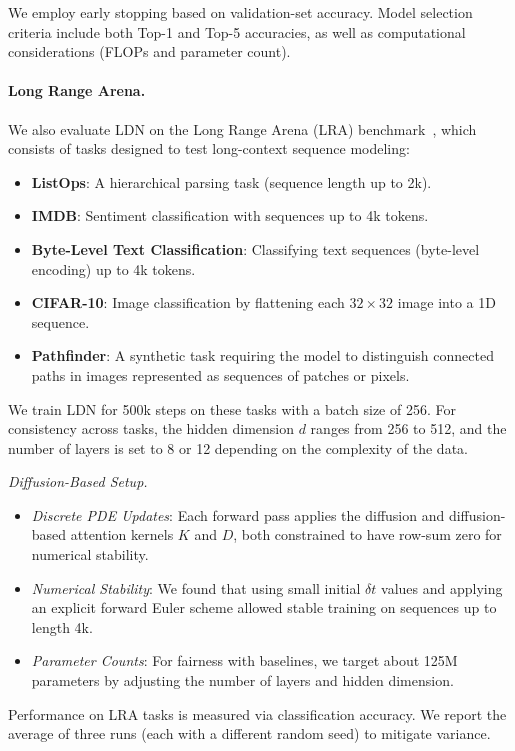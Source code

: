 We employ early stopping based on validation-set accuracy. Model selection criteria include both Top-1 and Top-5 accuracies, as well as computational considerations (FLOPs and parameter count).

\paragraph{Long Range Arena.}
We also evaluate LDN on the Long Range Arena (LRA) benchmark~\cite{tay2021long}, which consists of tasks designed to test long-context sequence modeling:
\begin{itemize}
    \item \textbf{ListOps}: A hierarchical parsing task (sequence length up to 2k).
    \item \textbf{IMDB}: Sentiment classification with sequences up to 4k tokens.
    \item \textbf{Byte-Level Text Classification}: Classifying text sequences (byte-level encoding) up to 4k tokens.
    \item \textbf{CIFAR-10}: Image classification by flattening each \(32 \times 32\) image into a 1D sequence.
    \item \textbf{Pathfinder}: A synthetic task requiring the model to distinguish connected paths in images represented as sequences of patches or pixels.
\end{itemize}
We train LDN for 500k steps on these tasks with a batch size of 256. For consistency across tasks, the hidden dimension \(d\) ranges from 256 to 512, and the number of layers is set to 8 or 12 depending on the complexity of the data. 

\textit{Diffusion-Based Setup.}  
\begin{itemize}
    \item \emph{Discrete PDE Updates}: Each forward pass applies the diffusion and diffusion-based attention kernels \(K\) and \(D\), both constrained to have row-sum zero for numerical stability. 
    \item \emph{Numerical Stability}: We found that using small initial \(\delta t\) values and applying an explicit forward Euler scheme allowed stable training on sequences up to length 4k. 
    \item \emph{Parameter Counts}: For fairness with baselines, we target about 125M parameters by adjusting the number of layers and hidden dimension. 
\end{itemize}

Performance on LRA tasks is measured via classification accuracy. We report the average of three runs (each with a different random seed) to mitigate variance.

